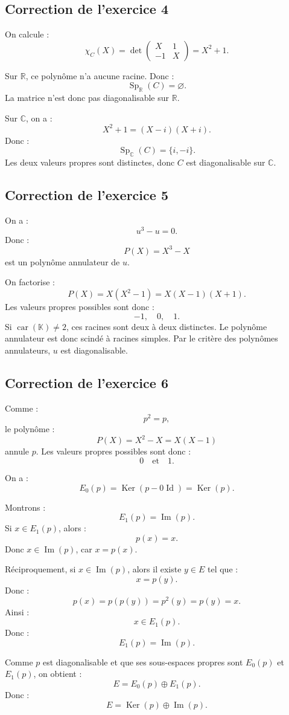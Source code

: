 \documentclass[11pt,a4paper]{article}
\newcommand{\K}{\mathbb K}
\newcommand{\R}{\mathbb R}
\newcommand{\C}{\mathbb C}
\newcommand{\Ker}{\operatorname{Ker}}
\newcommand{\Imf}{\operatorname{Im}}
\newcommand{\Id}{\operatorname{Id}}
\newcommand{\Sp}{\operatorname{Sp}}
\begin{document}
\subsection*{Correction de l'exercice 4}

On calcule :
\[
\chi_C(X)=
\det
\begin{pmatrix}
X&1\\
-1&X
\end{pmatrix}
=
X^2+1.
\]

Sur \(\R\), ce polynôme n'a aucune racine.  
Donc :
\[
\Sp_\R(C)=\varnothing.
\]
La matrice n'est donc pas diagonalisable sur \(\R\).

Sur \(\C\), on a :
\[
X^2+1=(X-i)(X+i).
\]
Donc :
\[
\Sp_\C(C)=\{i,-i\}.
\]
Les deux valeurs propres sont distinctes, donc \(C\) est diagonalisable sur \(\C\).

\subsection*{Correction de l'exercice 5}

On a :
\[
u^3-u=0.
\]
Donc :
\[
P(X)=X^3-X
\]
est un polynôme annulateur de \(u\).

On factorise :
\[
P(X)=X(X^2-1)=X(X-1)(X+1).
\]
Les valeurs propres possibles sont donc :
\[
-1,\quad0,\quad1.
\]
Si \(\operatorname{car}(\K)\neq2\), ces racines sont deux à deux distinctes.  
Le polynôme annulateur est donc scindé à racines simples.  
Par le critère des polynômes annulateurs, \(u\) est diagonalisable.

\subsection*{Correction de l'exercice 6}

Comme :
\[
p^2=p,
\]
le polynôme :
\[
P(X)=X^2-X=X(X-1)
\]
annule \(p\).  
Les valeurs propres possibles sont donc :
\[
0
\quad\text{et}\quad
1.
\]

On a :
\[
E_0(p)=\Ker(p-0\Id)=\Ker(p).
\]

Montrons :
\[
E_1(p)=\Imf(p).
\]
Si \(x\in E_1(p)\), alors :
\[
p(x)=x.
\]
Donc \(x\in\Imf(p)\), car \(x=p(x)\).

Réciproquement, si \(x\in\Imf(p)\), alors il existe \(y\in E\) tel que :
\[
x=p(y).
\]
Donc :
\[
p(x)=p(p(y))=p^2(y)=p(y)=x.
\]
Ainsi :
\[
x\in E_1(p).
\]
Donc :
\[
E_1(p)=\Imf(p).
\]

Comme \(p\) est diagonalisable et que ses sous-espaces propres sont \(E_0(p)\) et \(E_1(p)\), on obtient :
\[
E=E_0(p)\oplus E_1(p).
\]
Donc :
\[
E=\Ker(p)\oplus\Imf(p).
\]
\end{document}
